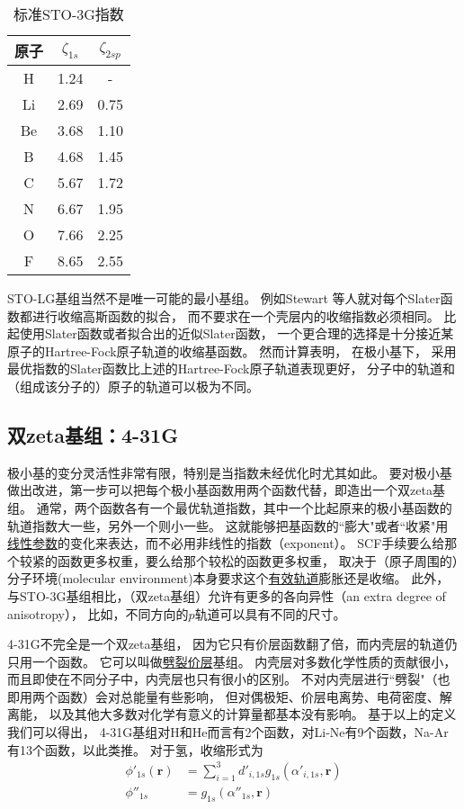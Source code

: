 \begin{table}[h]
	\centering\caption{标准STO-3G指数}
	\begin{tabular}{ccc}
		\hline
		原子&$\zeta_{1s}$&$\zeta_{2sp}$\\\hline
		H	 &1.24&-\\
		Li	 &2.69&0.75\\		
		Be	 &3.68&1.10\\
		B	 &4.68&1.45\\
		C	 &5.67&1.72\\
		N	 &6.67&1.95\\		
		O	 &7.66&2.25\\
		F	 &8.65&2.55\\
		\hline
	\end{tabular}
	\label{t3.8}
\end{table}

STO-LG基组当然不是唯一可能的最小基组。
例如Stewart\endnote{
}
等人就对每个Slater函数都进行收缩高斯函数的拟合，
而不要求在一个壳层内的收缩指数必须相同。
比起使用Slater函数或者拟合出的近似Slater函数，
一个更合理的选择是十分接近某原子的Hartree-Fock原子轨道的收缩基函数。
然而计算表明，
在极小基下，
采用最优指数的Slater函数比上述的Hartree-Fock原子轨道表现更好，
分子中的轨道和（组成该分子的）原子的轨道可以极为不同。

\subsection{双zeta基组：4-31G}
极小基的变分灵活性非常有限，特别是当指数未经优化时尤其如此。
要对极小基做出改进，第一步可以把每个极小基函数用两个函数代替，即造出一个双zeta基组。
通常，两个函数各有一个最优轨道指数，其中一个比起原来的极小基函数的轨道指数大一些，另外一个则小一些。
这就能够把基函数的``膨大"或者``收紧"用\underline{线性参数}的变化来表达，而不必用非线性的指数（exponent）。
SCF手续要么给那个较紧的函数更多权重，要么给那个较松的函数更多权重，
取决于（原子周围的）分子环境(molecular environment)本身要求这个\underline{有效轨道}膨胀还是收缩。
此外，与STO-3G基组相比，（双zeta基组）允许有更多的各向异性（an extra degree of anisotropy），
比如，不同方向的$p$轨道可以具有不同的尺寸。

4-31G不完全是一个双zeta基组，
因为它只有价层函数翻了倍，而内壳层的轨道仍只用一个函数。
它可以叫做\underline{劈裂价层}基组。
内壳层对多数化学性质的贡献很小，
而且即使在不同分子中，内壳层也只有很小的区别。
不对内壳层进行``劈裂"（也即用两个函数）会对总能量有些影响，
但对偶极矩、价层电离势、电荷密度、解离能，
以及其他大多数对化学有意义的计算量都基本没有影响。
基于以上的定义我们可以得出，
4-31G基组对H和He而言有2个函数，对Li-Ne有9个函数，Na-Ar有13个函数，以此类推。
对于氢，收缩形式为
\begin{align}
    \phi'_{1s}(\mathbf{r}) & = \sum_{i=1}^3 d'_{i,1s}g_{1s}(\alpha'_{i,1s}, \mathbf{r})
    \\
    \phi''_{1s} & = g_{1s}(\alpha''_{1s},\mathbf{r}) 
\end{align}

